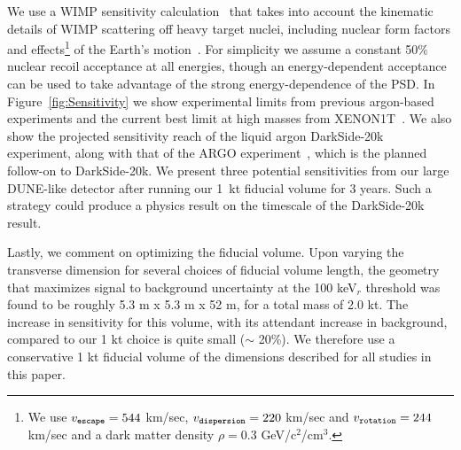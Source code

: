 \documentclass[a4paper,11pt]{article}
\begin{document}
We use a WIMP sensitivity calculation~\cite{loer-code} that takes into account the kinematic details of WIMP scattering off heavy target nuclei, including nuclear form factors and effects\footnote{We use $v_{\tt escape}=544$ km/sec, $v_{\tt dispersion}=220$ km/sec and $v_{\tt rotation}=244$ km/sec and a dark matter density $\rho=0.3$ GeV/c$^2$/cm$^3$.} of the Earth's motion~\cite{lewinsmith}. For simplicity we assume a constant 50\% nuclear recoil acceptance at all energies, though an energy-dependent acceptance can be used to take advantage of the strong energy-dependence of the PSD. In Figure~\ref{fig:Sensitivity} we show experimental limits from previous argon-based experiments and the current best limit at high masses from XENON1T~\cite{xenon1t}. We also show the projected sensitivity reach of the liquid argon  DarkSide-20k~\cite{DarkSide-20k} experiment, along with that of the ARGO experiment~\cite{DarkSide-20k}, which is the planned follow-on to DarkSide-20k. We present three potential sensitivities from our large DUNE-like detector after running our 1~kt fiducial volume for 3 years. Such a strategy could produce a physics result on the timescale of the DarkSide-20k result.

Lastly, we comment on optimizing the fiducial volume. Upon varying the transverse dimension for several choices of fiducial volume length, the geometry that maximizes signal to background uncertainty at the 100 keV$_r$ threshold was found to be roughly 5.3 m x 5.3 m x 52 m, for a total mass of 2.0 kt. The increase in sensitivity for this volume, with its attendant increase in background, compared to our 1 kt choice is quite small ($\sim$ 20\%). We therefore use a conservative 1 kt fiducial volume of the dimensions described for all studies in this paper.
\end{document}
